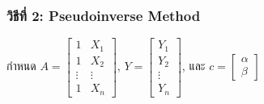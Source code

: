 \documentclass[12pt,a4paper]{article}
\begin{document}
\subsubsection*{วิธีที่ 2: Pseudoinverse Method}
กำหนด $A = \begin{bmatrix} 1 & X_1 \\ 1 & X_2 \\ \vdots & \vdots \\ 1 & X_n \end{bmatrix}$, 
$Y = \begin{bmatrix} Y_1 \\ Y_2 \\ \vdots \\ Y_n \end{bmatrix}$, 
และ $c = \begin{bmatrix} \alpha \\ \beta \end{bmatrix}$
\end{document}
